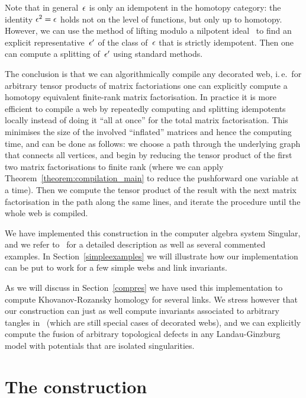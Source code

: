 \documentclass{compositio}
\theoremstyle{definition}
\numberwithin{equation}{section}
\begin{document}
Note that in general~$\epsilon$ is only an idempotent in the homotopy category: the identity $\epsilon^2 = \epsilon$ holds not on the level of functions, but only up to homotopy. However, we can use the method of lifting modulo a nilpotent ideal~\cite[Section~3.6]{LambekRingsModules} to find an explicit representative~$\epsilon'$ of the class of~$\epsilon$ that is strictly idempotent. Then one can compute a splitting of~$\epsilon'$ using standard methods. 

The conclusion is that we can algorithmically compile any decorated web, i.\,e.~for arbitrary tensor products of matrix factoriations one can explicitly compute a homotopy equivalent finite-rank matrix factorisation. In practice it is more efficient to compile a web by repeatedly computing and splitting idempotents locally instead of doing it ``all at once'' for the total matrix factorisation. This minimises the size of the involved ``inflated'' matrices and hence the computing time, and can be done as follows: we choose a path through the underlying graph that connects all vertices, and begin by reducing the tensor product of the first two matrix factorisations to finite rank (where we can apply Theorem~\ref{theorem:compilation_main} to reduce the pushforward one variable at a time). Then we compute the tensor product of the result with the next matrix factorisation in the path along the same lines, and iterate the procedure until the whole web is compiled. 

We have implemented this construction in the computer algebra system Singular, and we refer to~\cite{cmWebCompileCode} for a detailed description as well as several commented examples. In Section~\ref{simpleexamples} we will illustrate how our implementation can be put to work for a few simple webs and link invariants. 

As we will discuss in Section~\ref{compres} we have used this implementation to compute Khovanov-Rozansky homology for several links. We stress however that our construction can just as well compute invariants associated to arbitrary tangles in~\cite{kr0401268} (which are still special cases of decorated webs), and we can explicitly compute the fusion of arbitrary topological defects in any Landau-Ginzburg model with potentials that are isolated singularities.

\section{The construction}
\label{KRconstruction}
\end{document}
